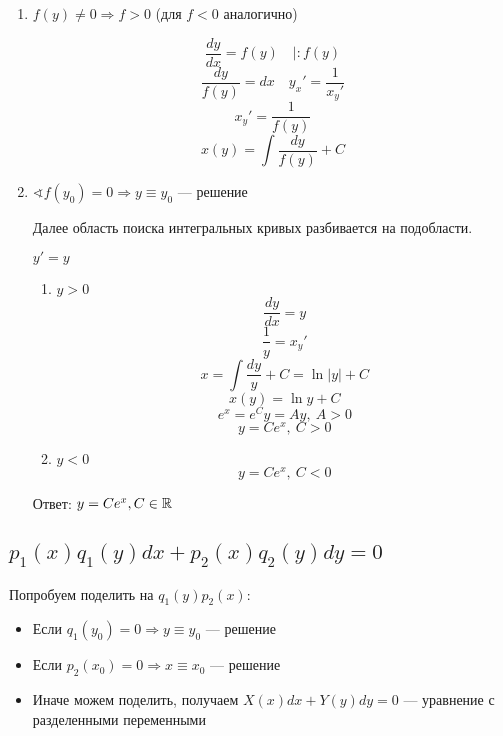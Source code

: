 \begin{enumerate}
    \item $f(y)\not=0 \Rightarrow f > 0$ (для $f<0$ аналогично)

          $$\frac{dy}{dx} = f(y) \quad \Big| : f(y)$$
          $$\frac{dy}{f(y)} = dx \quad y_x' = \frac{1}{x_y'}$$
          $$x_y' = \frac{1}{f(y)}$$
          $$x(y) = \int\frac{dy}{f(y)} + C$$
    \item $\sphericalangle f(y_0) = 0 \Rightarrow y \equiv y_0$ --- решение

          Далее область поиска интегральных кривых разбивается на подобласти.

          $y'=y$

          \begin{enumerate}
              \item $y>0$
                    $$\frac{dy}{dx} = y$$
                    $$\frac{1}{y}=x_y'$$
                    $$x = \int\frac{dy}{y} + C = \ln |y| + C$$
                    $$x(y)=\ln y + C$$
                    $$e^x = e^C y = Ay,\ A>0$$
                    $$y = C e^x,\ C>0$$

              \item $y<0$
                    $$y = C e^x,\ C<0$$
          \end{enumerate}

          Ответ: $y = Ce^x, C\in\mathbb{R}$
\end{enumerate}

\subsection{$p_1(x)q_1(y)dx + p_2(x)q_2(y)dy = 0$}

Попробуем поделить на $q_1(y)p_2(x)$:

\begin{itemize}
    \item Если $q_1(y_0)=0 \Rightarrow y \equiv y_0$ --- решение
    \item Если $p_2(x_0)=0 \Rightarrow x \equiv x_0$ --- решение
    \item Иначе можем поделить, получаем $X(x)dx + Y(y)dy=0$ --- уравнение с разделенными переменными
\end{itemize}

